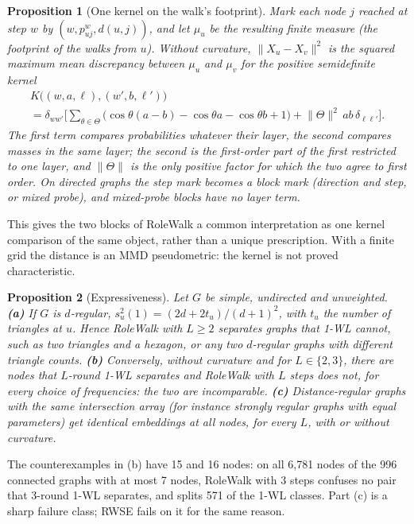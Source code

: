\documentclass[10pt]{article}
\newtheorem{proposition}{Proposition}
\theoremstyle{definition}
\newcommand{\Th}{\Theta}
\newcommand{\nTh}{\lVert\Theta\rVert}
\begin{document}
\begin{proposition}[One kernel on the walk's footprint]\label{prop:mmd}
Mark each node $j$ reached at step $w$ by $(w,\allowbreak p^w_{uj},\allowbreak d(u,j))$, and let $\mu_u$ be the resulting finite measure (the \emph{footprint} of the walks from $u$).
Without curvature, $\lVert X_u - X_v\rVert^2$ is the squared maximum mean discrepancy \citep{gretton2012} between $\mu_u$ and $\mu_v$ for the positive semidefinite kernel
\begin{multline*}
K\big((w,a,\ell),(w',b,\ell')\big) \\ = \delta_{ww'}\Big[\textstyle\sum_{\theta\in\Th}\big(\cos\theta(a-b) - \cos\theta a - \cos\theta b + 1\big) + \nTh^2\, ab\,\delta_{\ell\ell'}\Big].
\end{multline*}
The first term compares probabilities whatever their layer, the second compares masses in the same layer; the second is the first-order part of the first restricted to one layer, and $\nTh$ is the only positive factor for which the two agree to first order. On directed graphs the step mark becomes a block mark (direction and step, or mixed probe), and mixed-probe blocks have no layer term.
\end{proposition}

This gives the two blocks of RoleWalk a common interpretation as one kernel comparison of the same object, rather than a unique prescription. With a finite grid the distance is an MMD pseudometric: the kernel is not proved characteristic.

\begin{proposition}[Expressiveness]\label{prop:expr}
Let $G$ be simple, undirected and unweighted.
\textbf{(a)} If $G$ is $d$-regular, $s^2_u(1) = (2d+2t_u)/(d+1)^2$, with $t_u$ the number of triangles at $u$. Hence RoleWalk with $L\ge 2$ separates graphs that 1-WL cannot, such as two triangles and a hexagon, or any two $d$-regular graphs with different triangle counts.
\textbf{(b)} Conversely, without curvature and for $L\in\{2,3\}$, there are nodes that $L$-round 1-WL separates and RoleWalk with $L$ steps does not, for every choice of frequencies: the two are incomparable.
\textbf{(c)} Distance-regular graphs with the same intersection array (for instance strongly regular graphs with equal parameters) get identical embeddings at all nodes, for every $L$, with or without curvature.
\end{proposition}

The counterexamples in (b) have 15 and 16 nodes: on all 6,781 nodes of the 996 connected graphs with at most 7 nodes, RoleWalk with 3 steps confuses no pair that 3-round 1-WL separates, and splits 571 of the 1-WL classes.
Part (c) is a sharp failure class; RWSE fails on it for the same reason.
\end{document}
